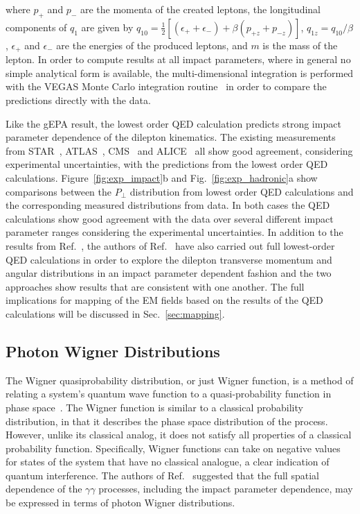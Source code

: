 \documentclass[twocolumn,epjc3]{svjour3}\sloppy
\begin{document}
where $p_{+}$ and $p_{-}$ are the momenta of the created leptons, the longitudinal components of $q_{1}$ are given by $q_{10} = \frac{1}{2}[(\epsilon_{+} + \epsilon_{-}) + \beta(p_{+z}+p_{-z})]$, $q_{1z} = q_{10}/ \beta$, $\epsilon_{+}$ and $\epsilon_{-}$ are the energies of the produced leptons, and $m$ is the mass of the lepton. In order to compute results at all impact parameters, where in general no simple analytical form is available, the multi-dimensional integration is performed with the VEGAS Monte Carlo integration routine~\cite{peterlepageNewAlgorithmAdaptive1978} in order to compare the predictions directly with the data. 

Like the gEPA result, the lowest order QED calculation predicts strong impact parameter dependence of the dilepton kinematics. The existing measurements from STAR~\cite{starcollaborationLowEnsuremathPair2018b,starcollaborationMeasurementMomentumAngular2021}, ATLAS~\cite{atlascollaborationExclusiveDimuonProduction2020,atlascollaborationObservationCentralityDependentAcoplanarity2018a}, CMS~\cite{cmscollaborationObservationForwardNeutron2020a} and ALICE~\cite{lehnerDielectronProductionLow2019a} all show good agreement, considering experimental uncertainties, with the predictions from the lowest order QED calculations. 
Figure~\ref{fig:exp_impact}b and Fig.~\ref{fig:exp_hadronic}a show comparisons between the $P_\perp$ distribution from lowest order QED calculations and the corresponding measured distributions from data. In both cases the QED calculations show good agreement with the data over several different impact parameter ranges considering the experimental uncertainties.
In addition to the results from Ref.~\cite{zhaInitialTransversemomentumBroadening2020b,brandenburgAcoplanarityQEDPairs2020b}, the authors of Ref.~\cite{liImpactParameterDependence2020} have also carried out full lowest-order QED calculations in order to explore the dilepton transverse momentum and angular distributions in an impact parameter dependent fashion and the two approaches show results that are consistent with one another.
The full implications for mapping of the EM fields based on the results of the QED calculations will be discussed in Sec.~\ref{sec:mapping}.

\subsection{Photon Wigner Distributions}
The Wigner quasiprobability distribution, or just Wigner function, is a method of relating a system's quantum wave function to a quasi-probability function in phase space~\cite{caseWignerFunctionsWeyl2008}. The Wigner function is similar to a classical probability distribution, in that it describes the phase space distribution of the process. However, unlike its classical analog, it does not satisfy all properties of a classical probability function. Specifically, Wigner functions can take on negative values for states of the system that have no classical analogue, a clear indication of quantum interference. The authors of Ref.~\cite{liImpactParameterDependence2020} suggested that the full spatial dependence of the $\gamma\gamma$ processes, including the impact parameter dependence, may be expressed in terms of photon Wigner distributions. 
\end{document}
